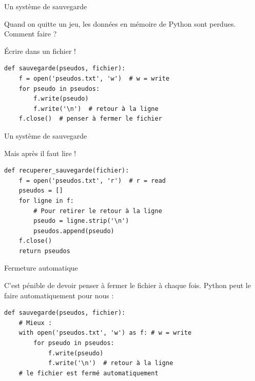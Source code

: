 \documentclass[x11names,svgnames]{beamer}
\begin{document}
\begin{frame}[fragile]{Un système de sauvegarde}

  Quand on quitte un jeu, les données en mémoire de Python sont perdues. Comment faire ?

  \pause

  Écrire dans un fichier !

  \begin{mdframed}[roundcorner=5pt]
\begin{verbatim}
def sauvegarde(pseudos, fichier):
    f = open('pseudos.txt', 'w')  # w = write
    for pseudo in pseudos:
        f.write(pseudo)
        f.write('\n')  # retour à la ligne
    f.close()  # penser à fermer le fichier
\end{verbatim}
  \end{mdframed}
\end{frame}

\begin{frame}[fragile]{Un système de sauvegarde}

  Mais après il faut lire !

  \pause

  \begin{mdframed}[roundcorner=5pt]
\begin{verbatim}
def recuperer_sauvegarde(fichier):
    f = open('pseudos.txt', 'r')  # r = read
    pseudos = []
    for ligne in f:
        # Pour retirer le retour à la ligne
        pseudo = ligne.strip('\n')
        pseudos.append(pseudo)
    f.close()
    return pseudos
\end{verbatim}
  \end{mdframed}
\end{frame}

\begin{frame}[fragile]{Fermeture automatique}

  C'est pénible de devoir penser à fermer le fichier à chaque fois. Python peut le faire automatiquement pour nous :

  \begin{mdframed}[roundcorner=5pt]
\begin{verbatim}
def sauvegarde(pseudos, fichier):
    # Mieux :
    with open('pseudos.txt', 'w') as f: # w = write
        for pseudo in pseudos:
            f.write(pseudo)
            f.write('\n')  # retour à la ligne
    # le fichier est fermé automatiquement
\end{verbatim}
  \end{mdframed}

\end{frame}
\end{document}
